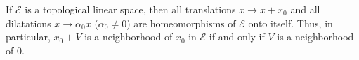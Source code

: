 If $\mathcal{E}$ is a topological linear space, then all translations $x \rightarrow x + x_0$ and all dilatations $x \rightarrow \alpha_0 x$ ($\alpha_0 \neq 0$) are homeomorphisms of $\mathcal{E}$ onto itself. Thus, in particular, $x_0 + V$ is a neighborhood of $x_0$ in $\mathcal{E}$ if and only if $V$ is a neighborhood of 0.
